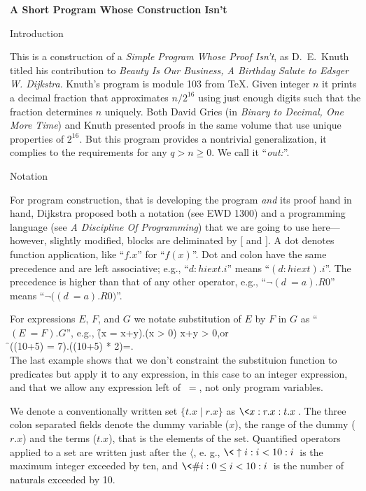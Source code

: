 
\def\title{A Short Program Whose Construction Isn't}
\def\out{{\it out:\/}}
\centerline{\bf \title}

\beginsection Introduction

This is a construction of a {\it Simple Program Whose Proof Isn't},
as D.~E.~Knuth titled his contribution to {\it Beauty Is Our
Business, A Birthday Salute to Edsger W. Dijkstra}.  Knuth's program
is module 103 from \TeX. Given integer $n$ it prints a decimal
fraction that approximates $n/2^{16}$ using just enough digits such
that the fraction determines $n$ uniquely.  Both David Gries (in
{\it Binary to Decimal, One More Time}) and Knuth presented proofs
in the same volume that use unique properties of $2^{16}$. But this
program provides a nontrivial generalization, it complies to the
requirements for any $q > n \ge 0$.  We call it ``\out''.

\beginsection Notation

For program construction, that is developing the program {\it and\/} its
proof hand in hand, Dijkstra proposed both a notation (see EWD
1300) and a programming language (see {\it A Discipline Of
Programming}) that we are going to use here---however, slightly
modified, blocks are deliminated by $[$ and $]$.
A dot denotes function application, like ``$f.x$'' for ``$f(x)$''.
Dot and colon have the same precedence and are left associative;
e.g., ``$d:hiext.i$'' means ``$(d:hiext).i$''.  The precedence is
higher than that of any other operator, e.g., ``$\neg(d \:= a).R0$''
means ``$\neg\bigl((d \:= a).R0\bigr)$''.

For expressions $E$, $F$, and $G$ we notate substitution of $E$ by
$F$ in $G$ as ``$(E \:= F).G$'', e.g.,
\f (x \:= x+y).(x > 0) \meq x+y > 0\qquad,\hbox{or}\\
\f \bigl((10+5) \:= 7\bigr).\bigl((10+5) * 2\bigr)\qquad=\qquad.\\
The last example shows that we don't constraint the
substituion function to predicates but apply it to any expression,
in this case to an integer expression, and that we allow any
expression left of $\:=$, not only program variables.

We denote a conventionally written set $\{t.x \mid r.x\}$ as $\<x :
r.x : t.x\>$. The three colon separated fields denote the dummy
variable ($x$), the range of the dummy ($r.x$) and the terms ($t.x$),
that is the elements of the set.  Quantified operators applied to
a set are written just after the $\langle$, e. g., $\<\mx i : i <
10 : i\>$ is the maximum integer exceeded by ten, and $\<\nbr i :
0 \le i < 10 : i\>$ is the number of naturals exceeded by 10.

